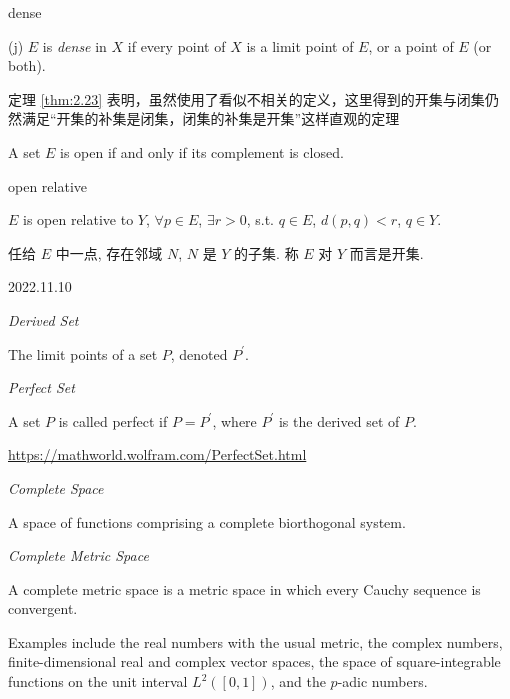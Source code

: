 \begin{definition} dense

    (j) $E$ is \emph{dense} in $X$ if every point of $X$ is a limit point of $E$, or a point of $E$ (or both).
\end{definition}

定理 \ref{thm:2.23} 表明，虽然使用了看似不相关的定义，这里得到的开集与闭集仍然满足``开集的补集是闭集，闭集的补集是开集''这样直观的定理
\begin{mynewthm}
    A set $E$ is open if and only if its complement is closed.
\end{mynewthm}

\begin{definition} open relative

    $E$ is open relative to $Y$, $\forall p \in E$, $\exists r>0$, s.t. $q \in E$, $d(p, q)<r$, $q \in Y$.
\end{definition}
任给 $E$ 中一点, 存在邻域 $N$, $N$ 是 $Y$ 的子集. 称 $E$ 对 $Y$ 而言是开集.


2022.11.10

\begin{definition}
    \emph{Derived Set}

    The limit points of a set ${P}$, denoted $P^{'}$. 
\end{definition}

\begin{definition}
    \emph{Perfect Set}

    A set $P$ is called perfect if $P=P^{'}$, where $P^{'}$ is the derived set of $P$.
\end{definition}
\url{https://mathworld.wolfram.com/PerfectSet.html}

\begin{definition}
    \emph{Complete Space}

    A space of functions comprising a complete biorthogonal system.
\end{definition}

\begin{definition}
    \emph{Complete Metric Space}

    A complete metric space is a metric space in which every Cauchy sequence is convergent.

    Examples include the real numbers with the usual metric, the complex numbers, finite-dimensional real and complex vector spaces, the space of square-integrable functions on the unit interval $L^2([0,1])$, and the $p$-adic numbers.
\end{definition}